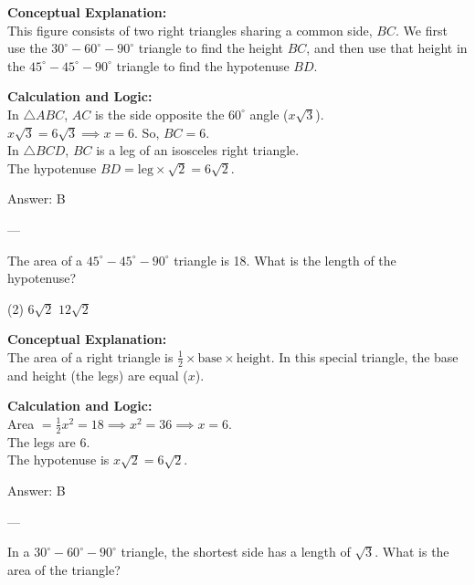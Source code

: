 \documentclass[11pt,paper=a4,answers]{exam}
\begin{document}
\begin{questions}
\begin{solution}
\textbf{Conceptual Explanation:} \\
This figure consists of two right triangles sharing a common side, $BC$. We first use the $30^\circ-60^\circ-90^\circ$ triangle to find the height $BC$, and then use that height in the $45^\circ-45^\circ-90^\circ$ triangle to find the hypotenuse $BD$.

\vspace{10pt}
\textbf{Calculation and Logic:} \\
In $\triangle ABC$, $AC$ is the side opposite the $60^\circ$ angle ($x\sqrt{3}$). \\
$x\sqrt{3} = 6\sqrt{3} \implies x = 6$. So, $BC = 6$. \\
In $\triangle BCD$, $BC$ is a leg of an isosceles right triangle. \\
The hypotenuse $BD = \text{leg} \times \sqrt{2} = 6\sqrt{2}$.

\vspace{15pt}
Answer: \colorbox{yellow!100}{B}
\end{solution}

---

\question
The area of a $45^\circ-45^\circ-90^\circ$ triangle is 18. What is the length of the hypotenuse?
\begin{tasks}(2)
    \task $6\sqrt{2}$
    \task $12\sqrt{2}$
\end{tasks}

\begin{solution}
\textbf{Conceptual Explanation:} \\
The area of a right triangle is $\frac{1}{2} \times \text{base} \times \text{height}$. In this special triangle, the base and height (the legs) are equal ($x$).

\vspace{10pt}
\textbf{Calculation and Logic:} \\
Area $= \frac{1}{2} x^2 = 18 \implies x^2 = 36 \implies x = 6$. \\
The legs are 6. \\
The hypotenuse is $x\sqrt{2} = 6\sqrt{2}$.

\vspace{15pt}
Answer: \colorbox{yellow!100}{B}
\end{solution}

---

\question
In a $30^\circ-60^\circ-90^\circ$ triangle, the shortest side has a length of $\sqrt{3}$. What is the area of the triangle?


\end{questions}
\end{document}
